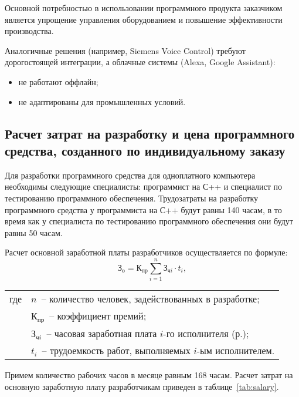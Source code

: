 Основной потребностью в использовании программного продукта заказчиком является упрощение управления оборудованием и повышение эффективности производства. 

Аналогичные решения (например, Siemens Voice Control) требуют дорогостоящей интеграции, а облачные системы (Alexa, Google Assistant):
\begin{itemize}
	\item не работают оффлайн;
	\item не адаптированы для промышленных условий.
\end{itemize}


\subsection{Расчет затрат на разработку и цена программного средства, созданного по индивидуальному заказу} 
\label{subsec:dev_cost_calculation}

Для разработки программного средства для одноплатного компьютера необходимы следующие специалисты: программист на С++ и специалист по тестированию программного обеспечения. Трудозатраты на разработку программного средства у программиста на С++ будут равны 140 часам, в то время как у специалиста по тестированию программного обеспечения они будут равны 50 часам.

Расчет основной заработной платы разработчиков осуществляется по формуле:
\begin{equation}
	\label{eq:base_salary}
	\mathrm{З_{о}} =  \mathrm{К_{пр}} \sum_{i=1}^n \text{З}_{\text{ч}i} \cdot t_i,
\end{equation}

\noindent\begin{tabular}{ll}
	где& \mbox{$n$ --} количество человек, задействованных в разработке; \\
	& \mbox{$\mathrm{К_{пр}}$ --} коэффициент премий;\\
	& \mbox{$\text{З}_{\text{ч}i}$ --} часовая заработная плата $i$-го исполнителя (р.); \\
	& \mbox{$t_i$ --} трудоемкость работ, выполняемых $i$-ым исполнителем.\\
\end{tabular}

Примем количество рабочих часов в месяце равным 168 часам. Расчет затрат на основную заработную плату разработчикам приведен в таблице~\ref{tab:salary}. 



